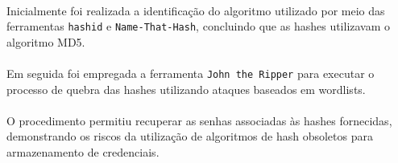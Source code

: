 \paragraph{}
Inicialmente foi realizada a identificação do algoritmo utilizado por meio das
ferramentas \texttt{hashid} e \texttt{Name-That-Hash}, concluindo que as hashes
utilizavam o algoritmo MD5.

\paragraph{}
Em seguida foi empregada a ferramenta \texttt{John the Ripper} para executar o
processo de quebra das hashes utilizando ataques baseados em wordlists.

\paragraph{}
O procedimento permitiu recuperar as senhas associadas às hashes fornecidas,
demonstrando os riscos da utilização de algoritmos de hash obsoletos para
armazenamento de credenciais.
